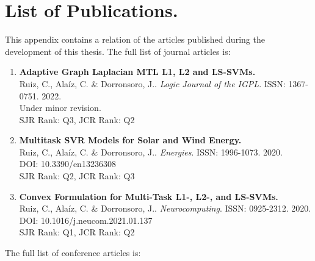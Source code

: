 


\chapter{List of Publications.}
\label{AppendixA}

This appendix contains a relation of the articles published during the development of this thesis.
%
The full list of journal articles is:
\begin{enumerate}
    \item \textbf{Adaptive Graph Laplacian MTL L1, L2 and
    LS-SVMs.}\\
    {Ruiz, C.}, Alaíz, C. \& Dorronsoro, J.. 
    \emph{Logic Journal of the IGPL}. ISSN: 1367-0751. 2022.\\
    Under minor revision.\\
    SJR Rank: Q3, JCR Rank: Q2
    \item \textbf{Multitask SVR Models for Solar and Wind Energy.}\\
    {Ruiz, C.}, Alaíz, C. \& Dorronsoro, J.. 
    \emph{Energies}. ISSN: 1996-1073. 2020.\\
    DOI: 10.3390/en13236308\\
    SJR Rank: Q2, JCR Rank: Q3
    \item \textbf{Convex Formulation for Multi-Task L1-, L2-, and LS-SVMs.}\\
    {Ruiz, C.}, Alaíz, C. \& Dorronsoro, J.. 
    \emph{Neurocomputing}. ISSN: 0925-2312. 2020.\\
    DOI: 10.1016/j.neucom.2021.01.137\\
    SJR Rank: Q1, JCR Rank: Q2
\end{enumerate}
%
The full list of conference articles is:
